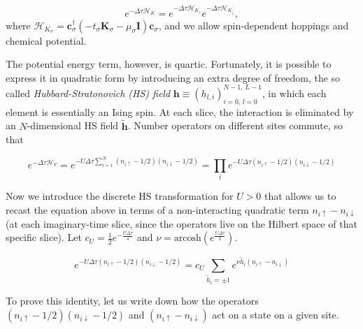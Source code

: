 \begin{equation}
e^{-\Delta\tau \mathcal{H}_K} = e^{-\Delta\tau \mathcal{H}_{K_\uparrow}} e^{-\Delta\tau \mathcal{H}_{K_\downarrow}} ,
\end{equation}
where $\mathcal{H}_{K_\sigma} = \bm c_\sigma^\dagger (-t_\sigma \bm K_\sigma - \mu_\sigma \bm I )  \bm c_\sigma$, and we allow spin-dependent hoppings and chemical potential.

The potential energy term, however, is quartic.
Fortunately, it is possible to express it in quadratic form by introducing an extra degree of freedom, the so called \emph{Hubbard-Stratonovich (HS) field} $\bm h \equiv (h_{l, i})_{i=0,\, l= 0}^{N-1, \, L - 1}$, in which each element is essentially an Ising spin.
At each slice, the interaction is eliminated by an $N$-dimensional HS field $\widetilde{\bm h}$.
Number operators on different sites commute, so that

\begin{equation}
e^{-\Delta\tau \mathcal{H}_V} = e^{-U \Delta\tau \sum_{i=1}^N (n_{i\uparrow} - 1/2 ) (n_{i\downarrow} - 1/2 )} = \prod_i e^{-U \Delta\tau (n_{i\uparrow} - 1/2 ) (n_{i\downarrow} - 1/2 )}
\end{equation}

Now we introduce the discrete HS transformation for $U > 0$ that allows us to recast the equation above in terms of a non-interacting quadratic term $n_{i\uparrow} - n_{i\downarrow} $ (at each imaginary-time slice, since the operators live on the Hilbert space of that specific slice).
Let $c_U = \frac{1}{2} e^{-\frac{U\Delta \tau}{4}}$ and $\nu = \text{arcosh} ( e^{\frac{U\Delta\tau}{2}})$.

\begin{equation}\label{eq:discreteHS}
e^{-U \Delta\tau (n_{i\uparrow} - 1/2 ) (n_{i\downarrow} - 1/2 )} = c_U \sum_{\widetilde{h}_i = \pm 1} e^{\nu \widetilde{h}_i (n_{i\uparrow} - n_{i\downarrow} )}
\end{equation}

To prove this identity, let us write down how the operators  $(n_{i\uparrow} - 1/2 ) (n_{i\downarrow} - 1/2 )$ and $(n_{i\uparrow} - n_{i\downarrow} )$ act on a state on a given site.


